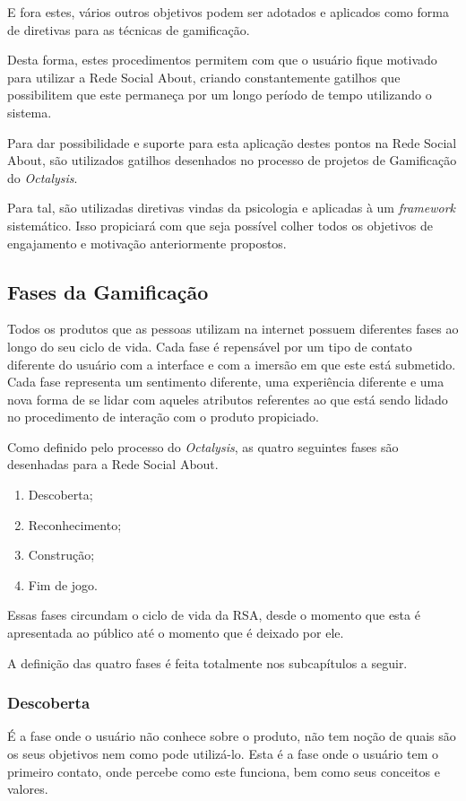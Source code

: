 E fora
estes, vários outros  objetivos podem ser adotados e aplicados como forma
de diretivas para as técnicas de gamificação.

Desta forma, estes procedimentos permitem com que o usuário fique motivado
para utilizar a Rede Social About, criando constantemente gatilhos que possibilitem
que este permaneça por um longo período de tempo utilizando o sistema.

Para dar possibilidade e suporte para esta aplicação destes pontos na Rede
Social About, são utilizados gatilhos desenhados no processo de projetos
de Gamificação do \textit{Octalysis}.

Para tal, são utilizadas diretivas vindas da psicologia e aplicadas à um
\textit{framework} sistemático. Isso propiciará com que seja possível colher
todos os objetivos de engajamento e motivação anteriormente propostos.

\subsection{Fases da Gamificação}
\label{sub:fasesgamifição}
Todos os produtos que as pessoas utilizam na internet possuem diferentes
fases ao longo do seu ciclo de vida. Cada fase é repensável por um tipo de contato diferente 
do usuário com a interface e com a imersão em que este está submetido.
Cada fase representa um sentimento diferente, uma experiência diferente
e uma nova forma de se lidar com aqueles atributos referentes ao que está
sendo lidado no procedimento de interação com o produto propiciado.

Como definido pelo processo do \textit{Octalysis}, as quatro seguintes fases são 
desenhadas para a Rede Social About.

\begin{enumerate}
    \item Descoberta;
    \item Reconhecimento;
    \item Construção;
    \item Fim de jogo.
\end{enumerate}

Essas fases circundam o ciclo de vida da RSA, desde o momento que esta
é apresentada ao público até o momento que é deixado por ele. 

A definição das quatro fases é feita totalmente nos subcapítulos a seguir.

\subsubsection{Descoberta}
\label{sub:descoperta}
É a fase onde o usuário não conhece sobre o produto, não tem noção de quais são os
seus objetivos nem como pode utilizá-lo. Esta é a fase onde o usuário tem o primeiro
contato, onde percebe como este funciona, bem como seus conceitos e valores.

